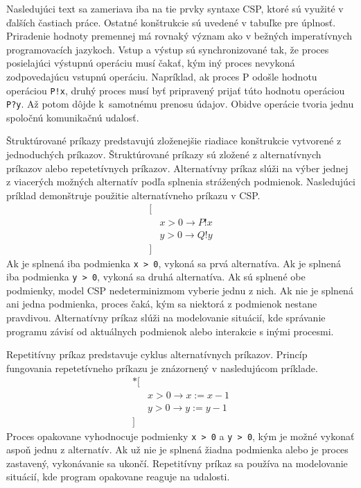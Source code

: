 \documentclass[
  biblatex,
  seconds=true,
  language=slovak,
  figures=false,
  urldate=iso,
  glossaries,
  index
]{kidiplom}
\begin{document}
Nasledujúci text sa zameriava iba na tie prvky syntaxe CSP, ktoré sú využité v ďalších častiach práce. Ostatné konštrukcie sú uvedené v tabuľke pre úplnosť.
Priradenie hodnoty premennej má rovnaký význam ako v bežných imperatívnych programovacích jazykoch.
Vstup a výstup sú synchronizované tak, že proces posielajúci výstupnú operáciu musí
čakať, kým iný proces nevykoná zodpovedajúcu vstupnú operáciu.
Napríklad, ak proces P odošle hodnotu operáciou \texttt{P!x}, druhý proces musí byť pripravený prijať túto hodnotu operáciou \texttt{P?y}. Až potom dôjde k~samotnému prenosu údajov.
Obidve operácie tvoria jednu spoločnú komunikačnú udalosť.

Štruktúrované príkazy predstavujú zloženejšie riadiace konštrukcie vytvorené z jednoduchých príkazov. Štruktúrované príkazy sú zložené z alternatívnych príkazov alebo repetetívnych príkazov. 
\newpage
Alternatívny príkaz slúži na výber jednej z viacerých možných alternatív podľa splnenia strážených podmienok. Nasledujúci príklad demonštruje použitie alternatívneho príkazu v CSP. 
\[
\begin{aligned}
[& \\
&x > 0 \rightarrow P!x\\
&y > 0 \rightarrow Q!y\\
]
\end{aligned}
\]
Ak je splnená iba podmienka \texttt{x > 0}, vykoná sa prvá alternatíva. Ak je splnená iba podmienka \texttt{y > 0}, vykoná sa druhá alternatíva. Ak sú splnené obe podmienky, model CSP nedeterminizmom vyberie jednu z nich. Ak nie je splnená ani jedna podmienka, proces čaká, kým sa niektorá z podmienok nestane pravdivou.
Alternatívny príkaz slúži na modelovanie situácií, kde správanie programu závisí od aktuálnych podmienok alebo
interakcie s inými procesmi. 

Repetitívny príkaz predstavuje cyklus alternatívnych príkazov. Princíp fungovania repetetívneho príkazu je znázornený v nasledujúcom príklade.
\[
\begin{aligned}
*[& \\
&x > 0 \rightarrow x := x - 1\\
&y > 0 \rightarrow y := y - 1\\
]
\end{aligned}
\]
Proces opakovane vyhodnocuje podmienky \texttt{x > 0} a \texttt{y > 0}, kým je možné vykonať aspoň jednu z alternatív. Ak už nie je splnená žiadna podmienka alebo je proces zastavený, vykonávanie sa ukončí.
Repetitívny príkaz sa používa na modelovanie situácií, kde program opakovane reaguje na udalosti.
\end{document}
